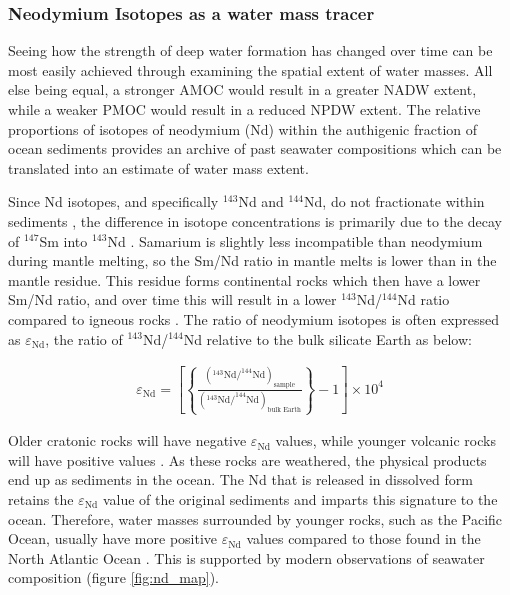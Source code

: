\subsubsection{Neodymium Isotopes as a water mass tracer}

Seeing how the strength of deep water formation has changed over time can be most easily achieved through examining the spatial extent of water masses. All else being equal, a stronger AMOC would result in a greater NADW extent, while a weaker PMOC would result in a reduced NPDW extent. The relative proportions of isotopes of neodymium (Nd) within the authigenic fraction of ocean sediments provides an archive of past seawater compositions which can be translated into an estimate of water mass extent. 

Since Nd isotopes, and specifically $^{143}$Nd and $^{144}$Nd, do not fractionate within sediments \citep{bizimisNeodymiumIsotopes2016}, the difference in isotope concentrations is primarily due to the decay of $^{147}$Sm into $^{143}$Nd \citep{lugmairSmNdAgesNew1974}. Samarium is slightly less incompatible than neodymium during mantle melting, so the Sm/Nd ratio in mantle melts is lower than in the mantle residue. This residue forms continental rocks which then have a lower Sm/Nd ratio, and over time this will result in a lower $^{143}$Nd/$^{144}$Nd ratio compared to igneous rocks \citep{bizimisNeodymiumIsotopes2016}. The ratio of neodymium isotopes is often expressed as $\varepsilon_\text{Nd}$, the ratio of $^{143}$Nd/$^{144}$Nd relative to the bulk silicate Earth \citep{goldsteinLonglivedIsotopicTracers2003} as below:

\begin{align}
\varepsilon_\text{Nd} = \left[ \left\{ \frac{(^{143}\text{Nd}/^{144}\text{Nd})_\text{sample}}{(^{143}\text{Nd}/^{144}\text{Nd})_\text{bulk Earth}}\right\} -1 \right]\times10^4
\end{align}

Older cratonic rocks will have negative $\varepsilon_\text{Nd}$ values, while younger volcanic rocks will have positive values \citep{lambeletNeodymiumIsotopicComposition2016}. As these rocks are weathered, the physical products end up as sediments in the ocean. The Nd that is released in dissolved form retains the $\varepsilon_\text{Nd}$ value of the original sediments and imparts this signature to the ocean. Therefore, water masses surrounded by younger rocks, such as the Pacific Ocean, usually have more positive $\varepsilon_\text{Nd}$ values compared to those found in the North Atlantic Ocean \citep{goldsteinLonglivedIsotopicTracers2003}. This is supported by modern observations of seawater composition (figure \ref{fig:nd_map}).

